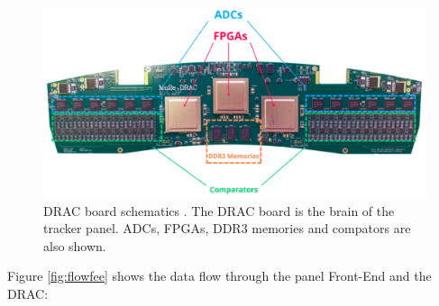 \begin{figure}[!h]
\centering
\includegraphics[width =\textwidth]{figures/png/Screenshot_20240204_115052.png}
\caption[The DRAC board schematics.]{DRAC board schematics \cite{drac}. 
The DRAC board is the brain of the tracker panel. ADCs, FPGAs, DDR3 
memories and compators are also shown.}
\label{fig:drac}
\end{figure}
Figure \ref{fig:flowfee} shows the data flow through the panel Front-End and the DRAC:
